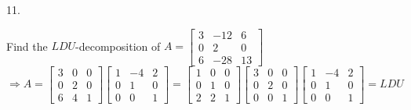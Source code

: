 \documentclass[12pt]{book}
\begin{document}
\begin{CJK}{UTF8}{bsmi}
11. \begin{minipage}[t]{\dimexpr\linewidth-2em}
Find the $LDU$-decomposition of $A=\begin{bmatrix}
3 & -12 &  6 \\
0 &   2 &  0 \\
6 & -28 & 13
\end{bmatrix}$ \\
$\Rightarrow A=\begin{bmatrix}
3 & 0 & 0 \\
0 & 2 & 0 \\
6 & 4 & 1
\end{bmatrix}\begin{bmatrix}
1 & -4 & 2 \\
0 &  1 & 0 \\
0 &  0 & 1
\end{bmatrix}=\begin{bmatrix}
1 & 0 & 0 \\
0 & 1 & 0 \\
2 & 2 & 1
\end{bmatrix}\begin{bmatrix}
3 & 0 & 0 \\
0 & 2 & 0 \\
0 & 0 & 1
\end{bmatrix}\begin{bmatrix}
1 & -4 & 2 \\
0 &  1 & 0 \\
0 &  0 & 1
\end{bmatrix}=LDU$
\end{minipage}\\


\end{CJK}
\end{document}
